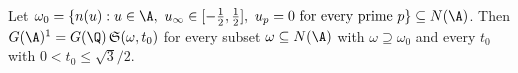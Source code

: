 Let $\omega_0=\{n(u):u\in\A,\ u_\infty\in[-\tfrac12,\tfrac12],\ u_p=0\text{ for every prime }p\}\subseteq N(\A)$. Then
$G(\A)^1=G(\Q)\,\mathfrak S(\omega,t_0)$ for every subset $\omega\subseteq N(\A)$ with $\omega\supseteq\omega_0$ and every
$t_0$ with $0<t_0\le\sqrt3/2$.
